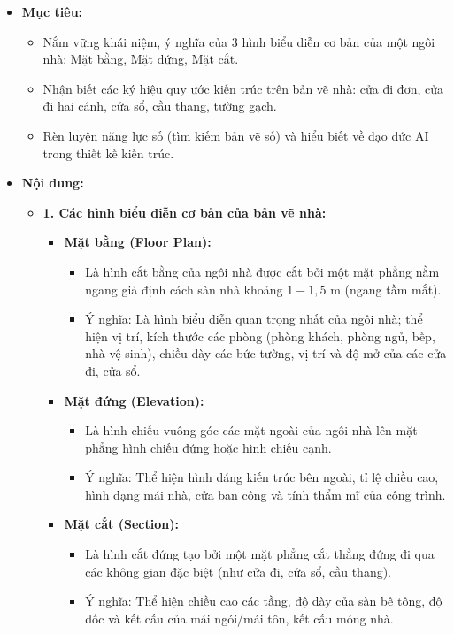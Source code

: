 \documentclass[12pt, a4paper]{article}
\begin{document}
\begin{itemize}[leftmargin=1.2cm]
    \item[a)] \textbf{Mục tiêu:}
    \begin{itemize}[leftmargin=0.6cm]
        \item Nắm vững khái niệm, ý nghĩa của 3 hình biểu diễn cơ bản của một ngôi nhà: Mặt bằng, Mặt đứng, Mặt cắt.
        \item Nhận biết các ký hiệu quy ước kiến trúc trên bản vẽ nhà: cửa đi đơn, cửa đi hai cánh, cửa sổ, cầu thang, tường gạch.
        \item Rèn luyện năng lực số (tìm kiếm bản vẽ số) và hiểu biết về đạo đức AI trong thiết kế kiến trúc.
    \end{itemize}

    \item[b)] \textbf{Nội dung:}
    \begin{itemize}[leftmargin=0.6cm]
        \item \textbf{1. Các hình biểu diễn cơ bản của bản vẽ nhà:}
        \begin{itemize}
            \item \textbf{Mặt bằng (Floor Plan):}
            \begin{itemize}
                \item Là hình cắt bằng của ngôi nhà được cắt bởi một mặt phẳng nằm ngang giả định cách sàn nhà khoảng $1 - 1{,}5\text{ m}$ (ngang tầm mắt).
                \item Ý nghĩa: Là hình biểu diễn quan trọng nhất của ngôi nhà; thể hiện vị trí, kích thước các phòng (phòng khách, phòng ngủ, bếp, nhà vệ sinh), chiều dày các bức tường, vị trí và độ mở của các cửa đi, cửa sổ.
            \end{itemize}
            \item \textbf{Mặt đứng (Elevation):}
            \begin{itemize}
                \item Là hình chiếu vuông góc các mặt ngoài của ngôi nhà lên mặt phẳng hình chiếu đứng hoặc hình chiếu cạnh.
                \item Ý nghĩa: Thể hiện hình dáng kiến trúc bên ngoài, tỉ lệ chiều cao, hình dạng mái nhà, cửa ban công và tính thẩm mĩ của công trình.
            \end{itemize}
            \item \textbf{Mặt cắt (Section):}
            \begin{itemize}
                \item Là hình cắt đứng tạo bởi một mặt phẳng cắt thẳng đứng đi qua các không gian đặc biệt (như cửa đi, cửa sổ, cầu thang).
                \item Ý nghĩa: Thể hiện chiều cao các tầng, độ dày của sàn bê tông, độ dốc và kết cấu của mái ngói/mái tôn, kết cấu móng nhà.
            \end{itemize}
        \end{itemize}


\end{itemize}
\end{itemize}
\end{document}
